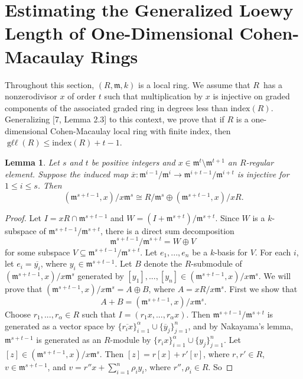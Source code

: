 \documentclass{amsart}
\newtheorem{lemma}[theorem]{Lemma}
\theoremstyle{definition}
\theoremstyle{definition}
\DeclareMathOperator{\gll}{\text{g}\ell\ell}
\numberwithin{equation}{section}
\theoremstyle{definition}
\begin{document}
{\section{\large{Estimating the Generalized Loewy Length of One-Dimensional Cohen-Macaulay Rings}}\text{}\newline Throughout this section, $(R,\mathfrak{m},k)$ is a local ring. We assume that $R$ \,has a nonzerodivisor $x$ of order $t$ such that multiplication by $x$ is injective on graded components of the associated graded ring in degrees less than $\text{index}(R)$. Generalizing [7, Lemma 2.3] to this context, we prove that if $R$ is a one-dimensional Cohen-Macaulay local ring with finite index, then $\gll(R) \leq \text{index}(R)+t-1$. \newline
\begin{lemma} Let $s$ and $t$ be positive integers and $x \in \mathfrak{m}^{t} \setminus \mathfrak{m}^{t+1}$ an $R$-regular element. Suppose the induced map $\overline{x}:\mathfrak{m}^{i-1}/\mathfrak{m}^{i} \longrightarrow \mathfrak{m}^{i+t-1}/\mathfrak{m}^{i+t}$ is injective for $1 \leq i \leq s$. Then \newline \[(\mathfrak{m}^{s+t-1},x)/x\mathfrak{m}^{s} \cong R/\mathfrak{m}^{s} \oplus (\mathfrak{m}^{s+t-1},x)/xR.\]\text{} \end{lemma}
\begin{proof} Let $I=xR \cap \mathfrak{m}^{s+t-1}$ and $W=(I+\mathfrak{m}^{s+t})/\mathfrak{m}^{s+t}$. Since $W$ is a $k$-subspace of $\mathfrak{m}^{s+t-1}/\mathfrak{m}^{s+t}$, there is a direct sum decomposition
\[\mathfrak{m}^{s+t-1}/\mathfrak{m}^{s+t}=W \oplus V\,\] for some subspace $V \subseteq \mathfrak{m}^{s+t-1}/\mathfrak{m}^{s+t}$. Let $e_{1},...,e_{n}$ be a $k$-basis for $V$. For each $i$, let $e_{i}=\overline{y_{i}}$, where $y_{i} \in \mathfrak{m}^{s+t-1}$. Let $B$ denote the $R$-submodule of $(\mathfrak{m}^{s+t-1},x)/x\mathfrak{m}^{s}$ generated by $[y_{1}],...,[y_{n}] \in (\mathfrak{m}^{s+t-1},x)/x\mathfrak{m}^{s}$. We will prove that $(\mathfrak{m}^{s+t-1},x)/x\mathfrak{m}^{s}=A \oplus B$, where $A=xR/x\mathfrak{m}^{s}$.
 First we show that 
 \[A+B=(\mathfrak{m}^{s+t-1},x)/x\mathfrak{m}^{s}. 
 \]\text{}\newline
 Choose $r_{1},...,r_{\alpha} \in R$ such that $I=(r_{1}x,...,r_{\alpha}x)$. Then $\mathfrak{m}^{s+t-1}/\mathfrak{m}^{s+t}$ is generated as a vector space by $\{\overline{r_{i}x}\}_{i=1}^{\alpha}\cup\{\overline{y}_{j}\}_{j=1}^{n}$, and by Nakayama's lemma, $\mathfrak{m}^{s+t-1}$ is generated as an $R$-module by $\{r_{i}x\}_{i=1}^{\alpha}\cup\{y_{j}\}_{j=1}^{n}$. Let $[z] \in (\mathfrak{m}^{s+t-1},x)/x\mathfrak{m}^{s}$. Then $[z]=r[x]+r'[v]$, where $r,r' \in R$, $v \in \mathfrak{m}^{s+t-1}$, and $v=r''x+\sum_{i=1}^{n}\rho_{i}y_{i}$, where $r'',\rho_{i} \in R$. So \newline

\end{proof}}
\end{document}
